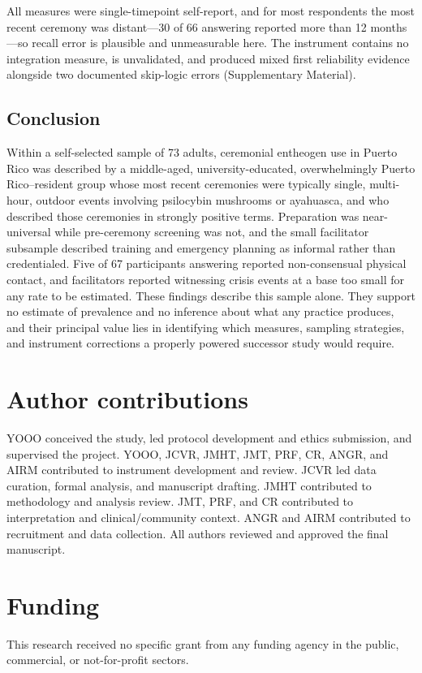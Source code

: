 \documentclass[12pt]{article}
\begin{document}
All measures were single-timepoint self-report, and for most respondents the most recent ceremony was
distant---30 of 66 answering reported more than 12 months---so recall error is plausible and unmeasurable
here. The instrument contains no integration measure, is unvalidated, and produced mixed first reliability
evidence alongside two documented skip-logic errors (Supplementary Material).

\subsection{Conclusion}

Within a self-selected sample of 73 adults, ceremonial entheogen use in Puerto Rico was described by a
middle-aged, university-educated, overwhelmingly Puerto Rico--resident group whose most recent ceremonies
were typically single, multi-hour, outdoor events involving psilocybin mushrooms or ayahuasca, and who
described those ceremonies in strongly positive terms. Preparation was near-universal while pre-ceremony
screening was not, and the small facilitator subsample described training and emergency planning as
informal rather than credentialed. Five of 67 participants answering reported non-consensual physical
contact, and facilitators reported witnessing crisis events at a base too small for any rate to be
estimated. These findings describe this sample alone. They support no estimate of prevalence and no
inference about what any practice produces, and their principal value lies in identifying which measures,
sampling strategies, and instrument corrections a properly powered successor study would require.

\section*{Author contributions}
YOOO conceived the study, led protocol development and ethics submission, and supervised the project.
YOOO, JCVR, JMHT, JMT, PRF, CR, ANGR, and AIRM contributed to instrument development and review. JCVR led
data curation, formal analysis, and manuscript drafting. JMHT contributed to methodology and analysis
review. JMT, PRF, and CR contributed to interpretation and clinical/community context. ANGR and AIRM
contributed to recruitment and data collection. All authors reviewed and approved the final manuscript.

\section*{Funding}
This research received no specific grant from any funding agency in the public, commercial, or
not-for-profit sectors.
\end{document}
